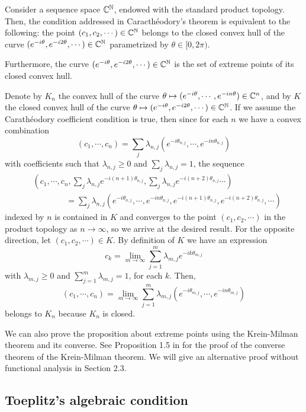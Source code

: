 \documentclass{../../small}
\begin{document}
\begin{prop}
Consider a sequence space $\mathbb{C}^{\mathbb{N}}$, endowed with the standard product topology.
Then, the condition addressed in Caracth\'eodory's theorem is equivalent to the following: the point $(c_1,c_2,\cdots)\in\mathbb{C}^{\mathbb{N}}$ belongs to the closed convex hull of the curve $(e^{-i\theta},e^{-i2\theta},\cdots)\in\mathbb{C}^{\mathbb{N}}$ parametrized by $\theta\in[0,2\pi)$.

Furthermore, the curve $(e^{-i\theta},e^{-i2\theta},\cdots)\in\mathbb{C}^{\mathbb{N}}$ is the set of extreme points of its closed convex hull.
\end{prop}
\begin{pf}
Denote by $K_n$ the convex hull of the curve $\theta\mapsto(e^{-i\theta},\cdots,e^{-in\theta})\in\mathbb{C}^n$, and by $K$ the closed convex hull of the curve $\theta\mapsto(e^{-i\theta},e^{-i2\theta},\cdots)\in\mathbb{C}^{\mathbb{N}}$.
If we assume the Carath\'eodory coefficient condition is true, then since for each $n$ we have a convex combination
\[(c_1,\cdots,c_n)=\sum_j\lambda_{n,j}(e^{-i\theta_{n,j}},\cdots,e^{-in\theta_{n,j}})\]
with coefficients such that $\lambda_{n,j}\ge0$ and $\sum_j\lambda_{n,j}=1$, the sequence
\begin{align*}
&(c_1,\cdots,c_n,\sum_j\lambda_{n,j}e^{-i(n+1)\theta_{n,j}},\sum_j\lambda_{n,j}e^{-i(n+2)\theta_{n,j}}\cdots)\\
&\qquad\qquad=\sum_j\lambda_{n,j}(e^{-i\theta_{n,j}},\cdots,e^{-in\theta_{n,j}},e^{-i(n+1)\theta_{n,j}},e^{-i(n+2)\theta_{n,j}},\cdots)
\end{align*}
indexed by $n$ is contained in $K$ and converges to the point $(c_1,c_2,\cdots)$ in the product topology as $n\to\infty$, so we arrive at the desired result.
For the opposite direction, let $(c_1,c_2,\cdots)\in K$.
By definition of $K$ we have an expression
\[c_k=\lim_{m\to\infty}\sum_{j=1}^m\lambda_{m,j}e^{-ik\theta_{m,j}}\]
with $\lambda_{m,j}\ge0$ and $\sum_{j=1}^m\lambda_{m,j}=1$, for each $k$.
Then,
\[(c_1,\cdots,c_n)=\lim_{m\to\infty}\sum_{j=1}^m\lambda_{m,j}(e^{-i\theta_{m,j}},\cdots,e^{-in\theta_{m,j}})\]
belongs to $K_n$ because $K_n$ is closed.

We can also prove the proposition about extreme points using the Krein-Milman theorem and its converse.
See Proposition 1.5 in \cite{phelps2001lectures} for the proof of the converse theorem of the Krein-Milman theorem.
We will give an alternative proof without functional analysis in Section 2.3.
\end{pf}


\subsection{Toeplitz's algebraic condition}
\end{document}
